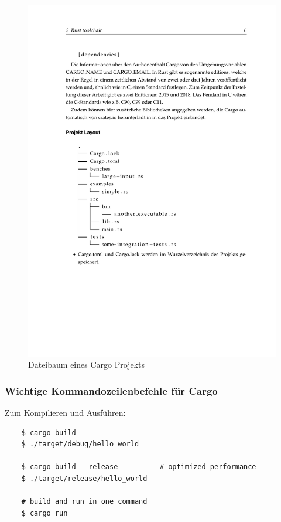 \begin{figure}[htbp]
    \centering
    \includegraphics{Toolchain/dateibaum.pdf}
    \caption{Dateibaum eines Cargo Projekts}
    \label{fig:dateibaum}
\end{figure}

\subsubsection{Wichtige Kommandozeilenbefehle für Cargo}

Zum Kompilieren und Ausführen:

\begin{lstlisting}
    $ cargo build
    $ ./target/debug/hello_world

    $ cargo build --release          # optimized performance
    $ ./target/release/hello_world

    # build and run in one command
    $ cargo run
\end{lstlisting}

